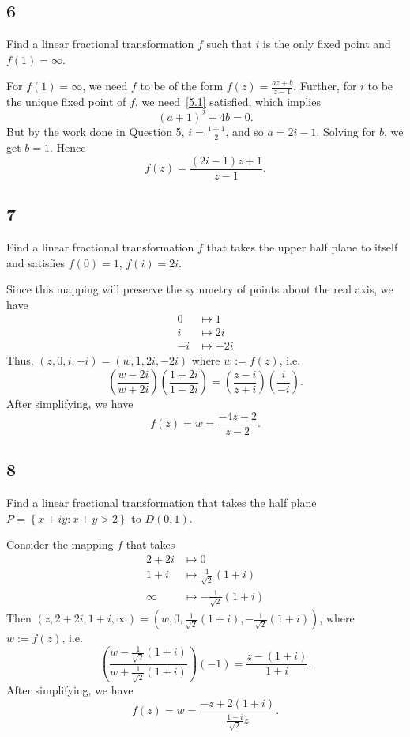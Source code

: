 \documentclass[12pt]{article}
\begin{document}
\newpage
\subsection*{6}
\begin{tcolorbox}
  Find a linear fractional transformation $f$ such that $i$ is the only fixed point and $f(1) = \infty$.
\end{tcolorbox}
For $f(1) = \infty$, we need $f$ to be of the form $f(z) = \frac{az + b}{z - 1}$. Further, for $i$ to be the unique fixed point of $f$, we
need~\eqref{5.1} satisfied, which implies 
\[ (a + 1)^{2} + 4b = 0. \]
But by the work done in Question 5, $i = \frac{1 + 1}{2}$, and so $a = 2i - 1$. Solving for $b$, we get $b = 1$. Hence
\[ f(z) = \frac{(2i - 1)z + 1}{z - 1}. \]


\subsection*{7}
\begin{tcolorbox}
  Find a linear fractional transformation $f$ that takes the upper half plane to itself and satisfies $f(0) = 1$, $f(i) = 2i$.
\end{tcolorbox}
Since this mapping will preserve the symmetry of points about the real axis, we have 
\begin{align*}
  0 & \mapsto 1 \\
  i & \mapsto 2i \\
  -i & \mapsto -2i
\end{align*}
Thus, $(z, 0, i, -i) = (w, 1, 2i, -2i)$ where $w := f(z)$, i.e.
\[ \left( \frac{w - 2i}{w + 2i} \right)\left( \frac{1 + 2i}{1 - 2i} \right) = \left( \frac{z - i}{z + i} \right)\left( \frac{i}{-i} \right). \]
After simplifying, we have 
\[ f(z) = w = \frac{-4z - 2}{z - 2}. \]

\newpage
\subsection*{8}
\begin{tcolorbox}
  Find a linear fractional transformation that takes the half plane $P = \left\{ x + iy : x + y > 2 \right\}$ to $D(0,1)$.
\end{tcolorbox}
Consider the mapping $f$ that takes
\begin{align*}
  2 + 2i & \mapsto 0 \\
  1 + i & \mapsto \frac{1}{\sqrt{2}}(1 + i) \\
  \infty & \mapsto -\frac{1}{\sqrt{2}}(1 + i)
\end{align*}
Then $(z, 2 + 2i, 1 + i, \infty) = \left(w, 0, \frac{1}{\sqrt{2}}(1 + i), -\frac{1}{\sqrt{2}}(1 + i)\right)$, where $w := f(z)$, i.e.
\[ \left( \frac{w - \frac{1}{\sqrt{2}}(1 + i)}{w + \frac{1}{\sqrt{2}}(1 + i)} \right)(-1) = \frac{z - (1 + i)}{1 + i}. \]
After simplifying, we have 
\[ f(z) = w = \frac{-z + 2(1+i)}{\frac{1-i}{\sqrt{2}}z}. \]
\end{document}
